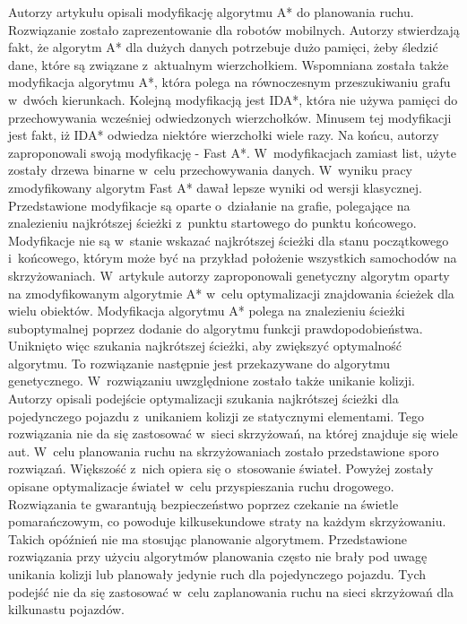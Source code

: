 \indent
Autorzy artykułu \cite{munteanmobile} opisali modyfikację algorytmu A* do planowania ruchu. Rozwiązanie zostało zaprezentowanie dla robotów mobilnych. Autorzy stwierdzają fakt, że algorytm A* dla dużych danych potrzebuje dużo pamięci, żeby śledzić dane, które są związane z~aktualnym wierzchołkiem. Wspomniana została także modyfikacja algorytmu A*, która polega na równoczesnym przeszukiwaniu grafu w~dwóch kierunkach. Kolejną modyfikacją jest IDA*, która nie używa pamięci do przechowywania wcześniej odwiedzonych wierzchołków. Minusem tej modyfikacji jest fakt, iż IDA* odwiedza niektóre wierzchołki wiele razy. Na końcu, autorzy zaproponowali swoją modyfikację - Fast A*. W~modyfikacjach zamiast list, użyte zostały drzewa binarne w~celu przechowywania danych. W~wyniku pracy zmodyfikowany algorytm Fast A* dawał lepsze wyniki od wersji klasycznej. Przedstawione modyfikacje są oparte o~działanie na grafie, polegające na znalezieniu najkrótszej ścieżki z~punktu startowego do punktu końcowego. Modyfikacje nie są w~stanie wskazać najkrótszej ścieżki dla stanu początkowego i~końcowego, którym może być na przykład położenie wszystkich samochodów na skrzyżowaniach.
\newline
\indent
W~artykule \cite{oleiwi2014modified} autorzy zaproponowali genetyczny algorytm oparty na zmodyfikowanym algorytmie A* w~celu optymalizacji znajdowania ścieżek dla wielu obiektów. Modyfikacja algorytmu A* polega na znalezieniu ścieżki suboptymalnej poprzez dodanie do algorytmu funkcji prawdopodobieństwa. Uniknięto więc szukania najkrótszej ścieżki, aby zwiększyć optymalność algorytmu. To rozwiązanie następnie jest przekazywane do algorytmu genetycznego. W~rozwiązaniu uwzględnione zostało także unikanie kolizji. Autorzy opisali podejście optymalizacji szukania najkrótszej ścieżki dla pojedynczego pojazdu z~unikaniem kolizji ze statycznymi elementami. Tego rozwiązania nie da się zastosować w~sieci skrzyżowań, na której znajduje się wiele aut.
\newline
\indent
W~celu planowania ruchu na skrzyżowaniach zostało przedstawione sporo rozwiązań. Większość z~nich opiera się o~stosowanie świateł. Powyżej zostały opisane optymalizacje świateł w~celu przyspieszania ruchu drogowego. Rozwiązania te gwarantują bezpieczeństwo poprzez czekanie na świetle pomarańczowym, co powoduje kilkusekundowe straty na każdym skrzyżowaniu. Takich opóźnień nie ma stosując planowanie algorytmem. Przedstawione rozwiązania przy użyciu algorytmów planowania często nie brały pod uwagę unikania kolizji lub planowały jedynie ruch dla pojedynczego pojazdu. Tych podejść nie da się zastosować w~celu zaplanowania ruchu na sieci skrzyżowań dla kilkunastu pojazdów.
